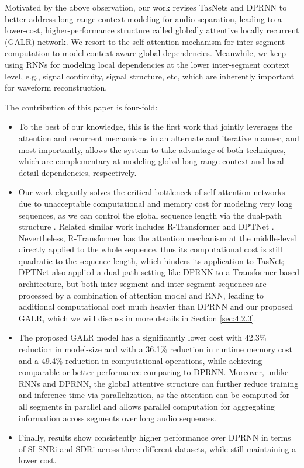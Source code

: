 \documentclass{article}
\begin{document}
Motivated by the above observation, our work revises TasNets and DPRNN to better address long-range context modeling for audio separation, leading to a lower-cost, higher-performance structure called globally attentive locally recurrent (GALR) network. We resort to the self-attention mechanism \cite{vaswani2017attention} for inter-segment computation to model context-aware global dependencies. Meanwhile, we keep using RNNs for modeling local dependencies at the lower inter-segment context level, e.g., signal continuity, signal structure, etc, which are inherently important for waveform reconstruction.

The contribution of this paper is four-fold:
\begin{itemize}[leftmargin=*]
\item To the best of our knowledge, this is the first work that jointly leverages the attention and recurrent mechanisms in an alternate and iterative manner, and most importantly, allows the system to take advantage of both techniques, which are complementary at modeling global long-range context and local detail dependencies, respectively. 

\item Our work elegantly solves the critical bottleneck of self-attention networks due to unacceptable computational and memory cost for modeling very long sequences, as we can control the global sequence length via the dual-path structure \cite{luo2019dual}. Related similar work includes R-Transformer \cite{wang2019r} and DPTNet \cite{chen2020dual}. Nevertheless, R-Transformer has the attention mechanism at the middle-level directly applied to the whole sequence, thus its computational cost is still quadratic to the sequence length, which hinders its application to TasNet; DPTNet also applied a dual-path setting like DPRNN to a Transformer-based architecture, but both inter-segment and inter-segment sequences are processed by a combination of attention model and RNN, leading to additional computational cost much heavier than DPRNN and our proposed GALR, which we will discuss in more details in Section \ref{sec:4.2.3}.


\item The proposed GALR model has a significantly lower cost with 42.3\% reduction in model-size and with a 36.1\% reduction in runtime memory cost and a 49.4\% reduction in computational operations, while achieving comparable or better performance comparing to DPRNN.
Moreover, unlike RNNs and DPRNN, the global attentive structure can further reduce training and inference time via parallelization, as the attention can be computed for all segments in parallel and allows parallel computation for aggregating information across segments over long audio sequences.

\item Finally, results show consistently higher performance over DPRNN in terms of SI-SNRi and SDRi across three different datasets, while still maintaining a lower cost.
\end{itemize}
\end{document}
